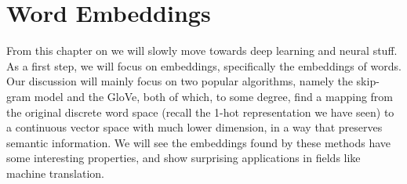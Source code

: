 \documentclass[../book-template.tex]{subfiles}
\begin{document}
\chapter{Word Embeddings}
From this chapter on we will slowly move towards deep learning and neural stuff. As a first step, we will focus on embeddings, specifically the embeddings of words. Our discussion will mainly focus on two popular algorithms, namely the skip-gram model and the GloVe, both of which, to some degree, find a mapping from the original discrete word space (recall the 1-hot representation we have seen) to a continuous vector space with much lower dimension, in a way that preserves semantic information. We will see the embeddings found by these methods have some interesting properties, and show surprising applications in fields like machine translation.
\end{document}
